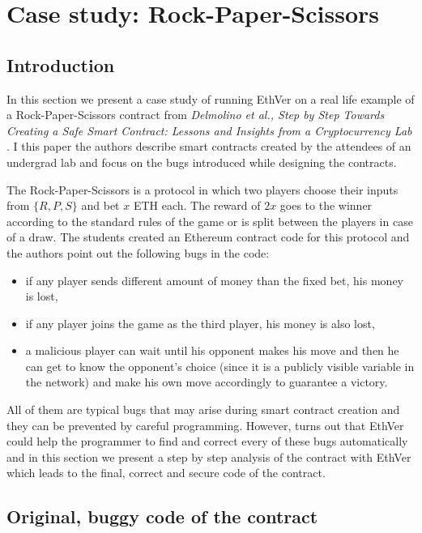 
\section{Case study: Rock-Paper-Scissors}

\subsection{Introduction}

In this section we present a case study of running EthVer on a real life example of a Rock-Paper-Scissors contract 
from \emph{Delmolino et al., Step by Step Towards Creating a Safe Smart Contract: Lessons and
Insights from a Cryptocurrency Lab} \cite{FCW:DAKMS16}. 
I this paper the authors describe smart contracts created by the attendees of an undergrad lab and focus on
the bugs introduced while designing the contracts.

The Rock-Paper-Scissors is a protocol in which two players choose their inputs from $\{R, P, S\}$ and bet
$x$ ETH each. The reward of $2x$ goes to the winner according to the standard rules of the game or is split
between the players in case of a draw.
The students created an Ethereum contract code for this protocol and the authors point out the following
bugs in the code:
\begin{itemize}
\item if any player sends different amount of money than the fixed bet, his money is lost,
\item if any player joins the game as the third player, his money is also lost,
\item a malicious player can wait until his opponent makes his move and then he can get to know the opponent's
choice (since it is a publicly visible variable in the network) and make his own move accordingly to guarantee
a victory.
\end{itemize}
All of them are typical bugs that may arise during smart contract creation and they can be prevented by careful 
programming.
However, turns out that EthVer could help the programmer
to find and correct every of these bugs automatically  and in this section we present a step by step analysis 
of the contract with EthVer which leads to the final, correct and secure code of the contract.


\subsection{Original, buggy code of the contract}

